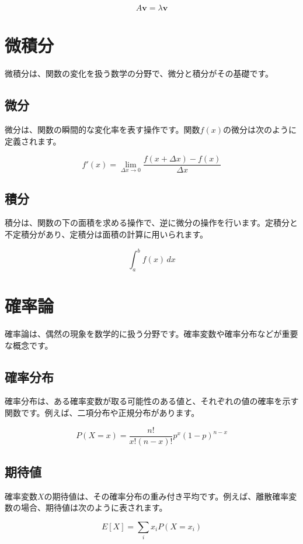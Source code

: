 \documentclass{article}
\begin{document}
\[
A \mathbf{v} = \lambda \mathbf{v}
\]

\section{微積分}
微積分は、関数の変化を扱う数学の分野で、微分と積分がその基礎です。

\subsection{微分}
微分は、関数の瞬間的な変化率を表す操作です。関数$f(x)$の微分は次のように定義されます。

\[
f'(x) = \lim_{\Delta x \to 0} \frac{f(x+\Delta x) - f(x)}{\Delta x}
\]

\subsection{積分}
積分は、関数の下の面積を求める操作で、逆に微分の操作を行います。定積分と不定積分があり、定積分は面積の計算に用いられます。

\[
\int_a^b f(x) \, dx
\]

\section{確率論}
確率論は、偶然の現象を数学的に扱う分野です。確率変数や確率分布などが重要な概念です。

\subsection{確率分布}
確率分布は、ある確率変数が取る可能性のある値と、それぞれの値の確率を示す関数です。例えば、二項分布や正規分布があります。

\[
P(X = x) = \frac{n!}{x!(n-x)!} p^x (1-p)^{n-x}
\]

\subsection{期待値}
確率変数$X$の期待値は、その確率分布の重み付き平均です。例えば、離散確率変数の場合、期待値は次のように表されます。

\[
E[X] = \sum_{i} x_i P(X = x_i)
\]
\end{document}
